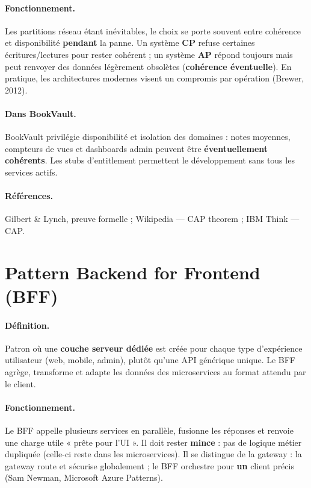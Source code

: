 \documentclass[12pt,a4paper]{report}
\begin{document}
\paragraph{Fonctionnement.} Les partitions réseau étant inévitables, le choix se porte souvent entre cohérence et disponibilité \textbf{pendant} la panne. Un système \textbf{CP} refuse certaines écritures/lectures pour rester cohérent ; un système \textbf{AP} répond toujours mais peut renvoyer des données légèrement obsolètes (\textbf{cohérence éventuelle}). En pratique, les architectures modernes visent un compromis par opération (Brewer, 2012).\par

\paragraph{Dans BookVault.} BookVault privilégie disponibilité et isolation des domaines : notes moyennes, compteurs de vues et dashboards admin peuvent être \textbf{éventuellement cohérents}. Les stubs d'entitlement permettent le développement sans tous les services actifs.\par

\paragraph{Références.} Gilbert \& Lynch, preuve formelle ; Wikipedia — CAP theorem ; IBM Think — CAP.\par


\section{Pattern Backend for Frontend (BFF)}

\paragraph{Définition.} Patron où une \textbf{couche serveur dédiée} est créée pour chaque type d'expérience utilisateur (web, mobile, admin), plutôt qu'une API générique unique. Le BFF agrège, transforme et adapte les données des microservices au format attendu par le client.\par

\paragraph{Fonctionnement.} Le BFF appelle plusieurs services en parallèle, fusionne les réponses et renvoie une charge utile « prête pour l'UI ». Il doit rester \textbf{mince} : pas de logique métier dupliquée (celle-ci reste dans les microservices). Il se distingue de la gateway : la gateway route et sécurise globalement ; le BFF orchestre pour \textbf{un} client précis (Sam Newman, Microsoft Azure Patterns).\par
\end{document}
